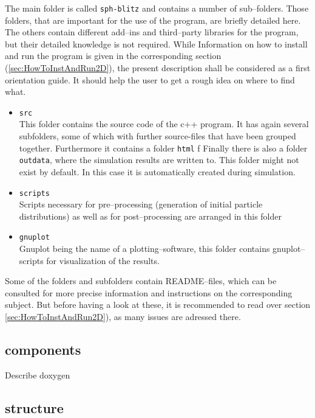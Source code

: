 \documentclass{report}
\begin{document}
The main folder is called {\tt sph-blitz} and contains a number of sub--folders. Those folders, that are important for the use of the program, are briefly detailed here. The others contain different add--ins and third--party libraries for the program, but their detailed knowledge is not required.
While Information on how to install and run the program is given in the corresponding section (\ref{sec:HowToInstAndRun2D}), the present description shall be considered as a first orientation guide. It should help the user to get a rough idea on where to find what.
\begin{itemize}
 \item {\tt src}\\
This folder contains the source code of the c++ program. It has again several subfolders, some of which with further source-files that have been grouped together.
Furthermore it contains a folder {\tt html} f
Finally there is also a folder {\tt outdata}, where the simulation results are written to. This folder might not exist by default. In this case it is automatically created during simulation. 
\item {\tt scripts}\\
Scripts necessary for pre--processing (generation of initial particle distributions) as well as for post--processing  are arranged in this folder
\item{\tt gnuplot}\\
Gnuplot being the name of a plotting--software, this folder contains gnuplot--scripts for visualization of the results.

\end{itemize}
Some of the folders and subfolders contain README--files, which can be consulted for more precise information and instructions on the corresponding subject. But before having a look at these, it is recommended to read over section \ref{sec:HowToInstAndRun2D}), as many issues are adressed there.









\subsection{components}
Describe doxygen

\subsection{structure}
\end{document}
